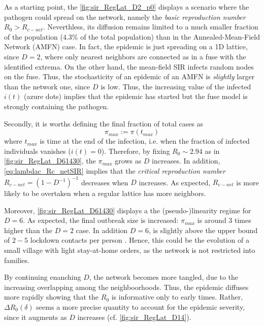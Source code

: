 \documentclass[a4paper,10pt,twoside]{book} %
\theoremstyle{definition}
\begin{document}
As a starting point, the \autoref{fig:sir_RegLat_D2_p0} displays a scenario where the pathogen could spread on the network, namely the \textit{basic reproduction number} $R_0 > R_{c-net}$. Neverthless, its diffusion remains limited to a much smaller fraction of the population ($4.3 \%$ of the total population) than in the Annealed-Mean-Field Network (AMFN) case. In fact, the epidemic is just spreading on a 1D lattice, since $ D = 2$, where only nearest neighbors are connected as in a fuse with the identified extrema. On the other hand, the mean-field SIR infects random nodes on the fuse. Thus, the stochasticity of an epidemic of an AMFN is \textit{slightly}  larger than the network one, since $ D$ is low. Thus, the increasing value of the infected $i(t)$ (azure dots) implies that the epidemic has started but the fuse model is strongly containing the pathogen. 

Secondly, it is worths defining the final fraction of total cases as
\begin{equation}
	\pi_{max} := \pi(t_{max})
	\label{eq:def_pmax}
\end{equation}
where $ t_{max}$ is time at the end of the infection, i.e. when the fraction of infected individuals vanishes ($i(t) = 0$).
Therefore, by fixing $R_0 \sim 2.94$ as in \autoref{fig:sir_RegLat_D61430}, the $ \pi_{max}$ grows as $D$ increases. In addition, \autoref{eq:lambdac_Rc_netSIR} implies that the
\textit{critical reproduction number} $R_{c-net} = (1-D^{-1})^{-1}$ decreases when $D$ increases. As expected, $R_{c-net}$ is more likely to be overtaken when a regular lattice has more neighbors.

Moreover, \autoref{fig:sir_RegLat_D61430} displays a the (pseudo-)linearity regime for $ D = 6$. As expected, the final outbreak size is increased: $ \pi_{max}$ is around $ 3$ times higher than the $ D=2$ case. In addition $D = 6$, is slightly above the upper bound of $2-5$ lockdown contacts per person \cite{Liu::2021_Review_SContactPattern}. Hence, this could be the evolution of a small village with light stay-at-home orders, as the network is not restricted into families.


By continuing enanching $ D$, the network becomes more tangled, due to the increasing overlapping among  the neighboorhoods. Thus, the epidemic diffuses more rapidly showing that the $ R_0$ is informative only to early times. Rather, $\Delta R_0(\delta)$ seems a more precise quantity to account for the epidemic severity, since it augments as $D$ increases (cf. \autoref{fig:sir_RegLat_D14}).
\end{document}
